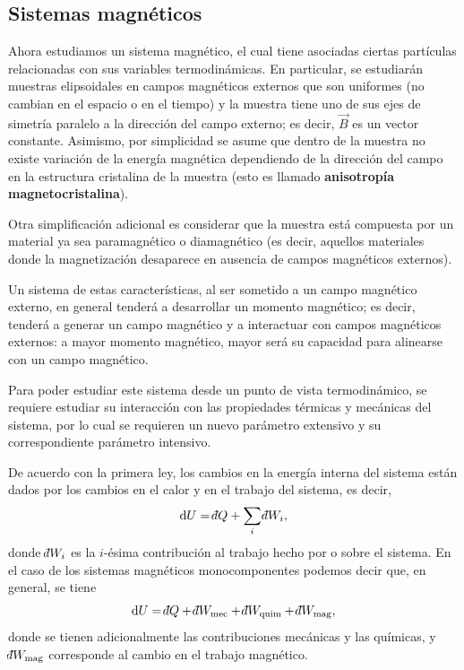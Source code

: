 \subsection*{Sistemas magnéticos}

Ahora estudiamos un sistema magnético, el cual tiene asociadas ciertas partículas relacionadas con
sus variables termodinámicas.
En particular, se estudiarán muestras elipsoidales en campos magnéticos externos que son uniformes
(no cambian en el espacio o en el tiempo) y la muestra tiene uno de sus ejes de simetría paralelo a
la dirección del campo externo; es decir, $\vec{B}$ es un vector constante. Asimismo, por
simplicidad se asume que dentro de la muestra no existe variación de la energía magnética
dependiendo de la dirección del campo en la estructura cristalina de la muestra (esto es llamado
\textbf{anisotropía magnetocristalina}).

Otra simplificación adicional es considerar que la muestra está compuesta por un material ya sea
paramagnético o diamagnético (es decir, aquellos materiales donde la magnetización desaparece en
ausencia de campos magnéticos externos).

Un sistema de estas características, al ser sometido a un campo magnético externo, en general
tenderá a desarrollar un momento magnético; es decir, tenderá a generar un campo magnético y a
interactuar con campos magnéticos externos: a mayor momento magnético, mayor será su capacidad para
alinearse con un campo magnético.

Para poder estudiar este sistema desde un punto de vista termodinámico, se requiere estudiar su
interacción con las propiedades térmicas y mecánicas del sistema, por lo cual se requieren un nuevo
parámetro extensivo y su correspondiente parámetro intensivo.

De acuerdo con la primera ley, los cambios en la energía interna del sistema están dados por los
cambios en el calor y en el trabajo del sistema, es decir,
\begin{equation*}
  \dd U=\dbar Q+\sum_{i}\dbar W_i,
\end{equation*}
donde $\dbar W_i$ es la $i$-ésima contribución al trabajo hecho por o sobre el sistema. En el caso de
los sistemas magnéticos monocomponentes podemos decir que, en general, se tiene
\begin{equation*}
  \dd U=\dbar Q+\dbar W_{\mathrm{mec}}+\dbar W_{\mathrm{quim}}+\dbar W_{\mathrm{mag}},
\end{equation*}
donde se tienen adicionalmente las contribuciones mecánicas y las químicas, y $\dbar W_{\mathrm{mag}}$
corresponde al cambio en el trabajo magnético.

